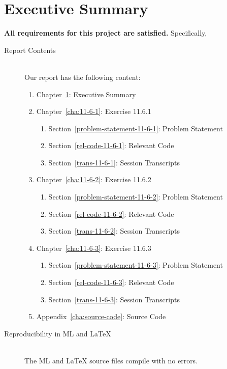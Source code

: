 \documentclass{report}
\begin{document}
\chapter{Executive Summary}
\label{cha:executive-summary}
\textbf{All requirements for this project are satisfied.}
Specifically,
\begin{description}
\item[Report Contents] \ \\
  Our report has the following content:
  \begin{enumerate}[{}]
  \item Chapter~\ref{cha:executive-summary}: Executive Summary
  \item Chapter~\ref{cha:11-6-1}: Exercise 11.6.1
    \begin{enumerate}[{}]
    \item Section~\ref{problem-statement-11-6-1}: Problem Statement
    \item Section~\ref{rel-code-11-6-1}: Relevant Code 
    \item Section~\ref{trans-11-6-1}: Session Transcripts
    \end{enumerate}
  \item Chapter~\ref{cha:11-6-2}: Exercise 11.6.2
    \begin{enumerate}[{}]
    \item Section~\ref{problem-statement-11-6-2}: Problem Statement
    \item Section~\ref{rel-code-11-6-2}: Relevant Code
    \item Section~\ref{trans-11-6-2}: Session Transcripts
    \end{enumerate}
  \item Chapter~\ref{cha:11-6-3}: Exercise 11.6.3
    \begin{enumerate}[{}]
    \item Section~\ref{problem-statement-11-6-3}: Problem Statement
    \item Section~\ref{rel-code-11-6-3}: Relevant Code
    \item Section~\ref{trans-11-6-3}: Session Transcripts
    \end{enumerate}
 \item Appendix~\ref{cha:source-code}: Source Code
  \end{enumerate}
\item[Reproducibility in ML and \LaTeX{}] \ \\
  The ML and \LaTeX{} source files compile with no errors.
\end{description}
\end{document}

